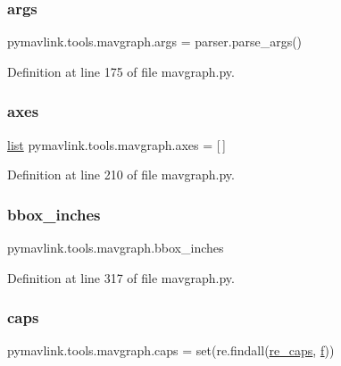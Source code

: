 \subsubsection{\texorpdfstring{args}{args}}
{\footnotesize\ttfamily pymavlink.\+tools.\+mavgraph.\+args = parser.\+parse\+\_\+args()}



Definition at line 175 of file mavgraph.\+py.

\mbox{\label{namespacepymavlink_1_1tools_1_1mavgraph_afd432b1bca4905c45ba006069d4a334b}} 
\subsubsection{\texorpdfstring{axes}{axes}}
{\footnotesize\ttfamily \mbox{\hyperlink{structlist}{list}} pymavlink.\+tools.\+mavgraph.\+axes = \mbox{[}$\,$\mbox{]}}



Definition at line 210 of file mavgraph.\+py.

\mbox{\label{namespacepymavlink_1_1tools_1_1mavgraph_a2205030986d0f4e395eae2699c316ce6}} 
\subsubsection{\texorpdfstring{bbox\_inches}{bbox\_inches}}
{\footnotesize\ttfamily pymavlink.\+tools.\+mavgraph.\+bbox\+\_\+inches}



Definition at line 317 of file mavgraph.\+py.

\mbox{\label{namespacepymavlink_1_1tools_1_1mavgraph_a1c47282326c5970a16b8259d22d07c83}} 
\subsubsection{\texorpdfstring{caps}{caps}}
{\footnotesize\ttfamily pymavlink.\+tools.\+mavgraph.\+caps = set(re.\+findall(\mbox{\hyperlink{namespacepymavlink_1_1tools_1_1mavgraph_a3635bc37df2af78d82ed236ef6f8b265}{re\+\_\+caps}}, \mbox{\hyperlink{namespacepymavlink_1_1tools_1_1mavgraph_a34244bcf38be037e4baad2d9e02f87f4}{f}}))}



